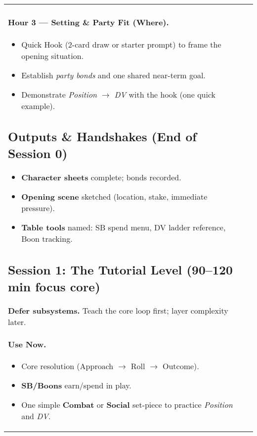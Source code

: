 \begin{tabularx}{\linewidth}{>{\bfseries}l X}
\paragraph{Hour 3 — Setting \& Party Fit (Where).}
\begin{itemize}
  \item Quick Hook (2-card draw or starter prompt) to frame the opening situation.
  \item Establish \emph{party bonds} and one shared near-term goal.
  \item Demonstrate \emph{Position} $\rightarrow$ \emph{DV} with the hook (one quick example).
\end{itemize}

\subsection*{Outputs \& Handshakes (End of Session 0)}
\begin{itemize}
  \item \textbf{Character sheets} complete; bonds recorded.
  \item \textbf{Opening scene} sketched (location, stake, immediate pressure).
  \item \textbf{Table tools} named: SB spend menu, DV ladder reference, Boon tracking.
\end{itemize}

\subsection*{Session 1: The Tutorial Level (90–120 min focus core)}
\begin{tcolorbox}[title={Crucial Advice},colback=gray!5,colframe=black]
\textbf{Defer subsystems.} Teach the core loop first; layer complexity later.
\end{tcolorbox}

\paragraph{Use Now.}
\begin{itemize}
  \item Core resolution (Approach $\rightarrow$ Roll $\rightarrow$ Outcome).
  \item \textbf{SB/Boons} earn/spend in play.
  \item One simple \textbf{Combat} or \textbf{Social} set-piece to practice \emph{Position} and \emph{DV}.
\end{itemize}


\end{tabularx}
